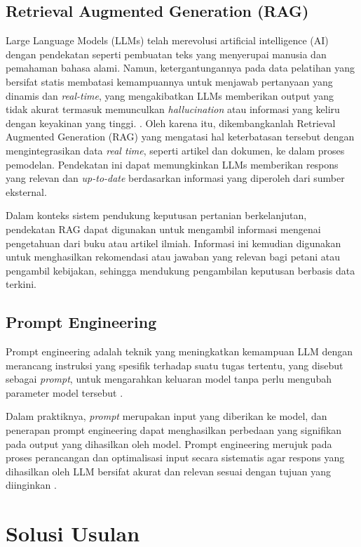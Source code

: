 \documentclass{article} %
\begin{document}
\subsection{Retrieval Augmented Generation (RAG)}
Large Language Models (LLMs) telah merevolusi artificial intelligence (AI) dengan pendekatan seperti pembuatan teks yang menyerupai manusia dan pemahaman bahasa alami. Namun, ketergantungannya pada data pelatihan yang bersifat statis membatasi kemampuannya untuk menjawab pertanyaan yang dinamis dan \textit{real-time}, yang mengakibatkan LLMs memberikan output yang tidak akurat \cite{b8} termasuk memunculkan \textit{hallucination} atau informasi yang keliru dengan keyakinan yang tinggi. \cite{b9}. Oleh karena itu, dikembangkanlah Retrieval Augmented Generation (RAG) yang mengatasi hal keterbatasan tersebut dengan mengintegrasikan data \textit{real time}, seperti artikel dan dokumen, ke dalam proses pemodelan. Pendekatan ini dapat memungkinkan LLMs memberikan respons yang  relevan dan \textit{up-to-date} berdasarkan informasi yang diperoleh dari sumber eksternal\cite{b8}.

Dalam konteks sistem pendukung keputusan pertanian berkelanjutan, pendekatan RAG dapat digunakan untuk mengambil informasi mengenai pengetahuan dari buku atau artikel ilmiah. Informasi ini kemudian digunakan untuk menghasilkan rekomendasi atau jawaban yang relevan bagi petani atau pengambil kebijakan, sehingga mendukung pengambilan keputusan berbasis data terkini.

\subsection{Prompt Engineering}
Prompt engineering adalah teknik yang meningkatkan kemampuan LLM dengan merancang instruksi yang spesifik terhadap suatu tugas tertentu, yang disebut sebagai \textit{prompt}, untuk mengarahkan keluaran model tanpa perlu mengubah parameter model tersebut \cite{b14}.

Dalam praktiknya, \textit{prompt} merupakan input yang diberikan ke model, dan penerapan prompt engineering dapat menghasilkan perbedaan yang signifikan pada output yang dihasilkan oleh model. Prompt engineering merujuk pada proses perancangan dan optimalisasi input secara sistematis agar respons yang dihasilkan oleh LLM bersifat akurat dan relevan sesuai dengan tujuan yang diinginkan \cite{b15}.
\section{Solusi Usulan}
\end{document}
